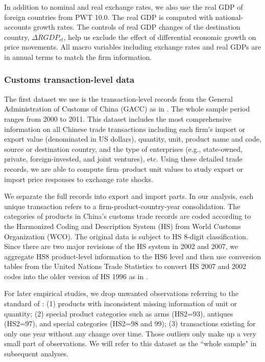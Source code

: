 \documentclass[12pt]{article}
\begin{document}
In addition to nominal and real exchange rates, we also use the real GDP of foreign countries from PWT 10.0. The real GDP is computed with national-accounts growth rates. The controls of real GDP changes of the destination country, $\Delta RGDP_{ct}$, help us exclude the effect of differential economic growth on price movements. All macro variables including exchange rates and real GDPs are in annual terms to match the firm information.

\subsubsection{Customs transaction-level data} \label{Data-Customs}

The first dataset we use is the transaction-level records from the General Administration of Customs of China (GACC) as in \cite{manova-zhang2012}. The whole sample period ranges from 2000 to 2011. This dataset includes the most comprehensive information on all Chinese trade transactions including each firm's import or export value (denominated in US dollars), quantity, unit, product name and code, source or destination country, and the type of enterprises (e.g., state-owned, private, foreign-invested, and joint ventures), etc. Using these detailed trade records, we are able to compute firm–product unit values to study export or import price responses to exchange rate shocks. 

We separate the full records into export and import parts. In our analysis, each unique transaction refers to a firm-product-country-year consolidation. The categories of products in China's customs trade records are coded according to the Harmonized Coding and Description System (HS) from World Customs Organization (WCO). The original data is subject to HS 8-digit classification. Since there are two major revisions of the HS system in 2002 and 2007, we aggregate HS8 product-level information to the HS6 level and then use conversion tables from the United Nations Trade Statistics to convert HS 2007 and 2002 codes into the older version of HS 1996 as in \cite{fan-li-yeaple2015}.

For later empirical studies, we drop unwanted observations referring to the standard of \cite{lmx2015}: (1) products with inconsistent missing information of unit or quantity; (2) special product categories such as arms (HS2=93), antiques (HS2=97), and special categories (HS2=98 and 99); (3) transactions existing for only one year without any change over time. Those outliers only make up a very small part of observations. We will refer to this dataset as the ``whole sample" in subsequent analyses.
\end{document}
